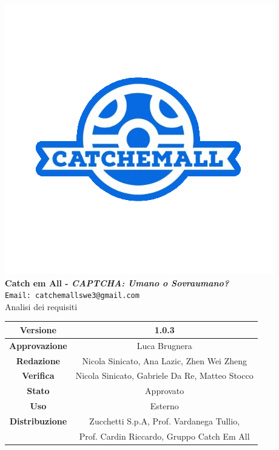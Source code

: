 \begin{titlepage}
\begin{center}
	\includegraphics[scale = 1.5]{img/logo.png}\\
	\bigskip
	\large \textbf{Catch em All - \textit{CAPTCHA: Umano o Sovraumano?}}\\
	\texttt{Email: catchemallswe3@gmail.com}\\
	\vfill
	{\fontsize{1.5cm}{0}\selectfont Analisi dei requisiti}\\
	\vfill
	\setlength\extrarowheight{5pt}
	\begin{tabularx}{\textwidth}{| c | c |}
		\hline
		\textbf{Versione} & 1.0.3\\
		\hline
		\textbf{Approvazione} & Luca Brugnera\\
		\hline
		\textbf{Redazione} & Nicola Sinicato, Ana Lazic, Zhen Wei Zheng\\
		\hline
		\textbf{Verifica} & Nicola Sinicato, Gabriele Da Re, Matteo Stocco\\
		\hline
		\textbf{Stato} & Approvato\\
		\hline
		\textbf{Uso} & Esterno\\
		\hline
		\textbf{Distribuzione} & Zucchetti S.p.A, Prof. Vardanega Tullio, \\
		&  Prof. Cardin Riccardo, Gruppo Catch Em All\\
		\hline
	\end{tabularx}
\end{center}
\end{titlepage}
